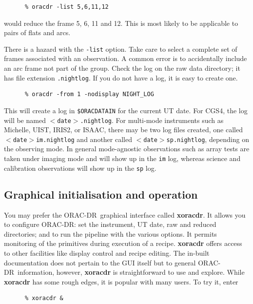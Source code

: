 \documentclass[twoside,11pt]{article}
\newcommand{\htmlref}[2]{#1}
\newcommand{\xref}[3]{#1}
\newcommand{\xlabel}[1]{}
\renewcommand{\_}{\texttt{\symbol{95}}}
\newcommand{\ORACDR}{{\footnotesize ORAC-DR}}
\begin{document}
\begin{verbatim}
      % oracdr -list 5,6,11,12
\end{verbatim}
would reduce the frame 5, 6, 11 and 12. This is most likely to
be applicable to pairs of flats and arcs.

There is a hazard with the {\tt -list} option. Take care to select
a complete set of frames associated with an observation. A common
error is to accidentally include an arc frame not part of the
group. Check the log on the raw data directory; it has file
extension {\tt .nightlog}. If you do not have a log, it is easy to
create one.
\label{night_log}

\begin{verbatim}
      % oracdr -from 1 -nodisplay NIGHT_LOG
\end{verbatim}
This will create a log in {\tt \$ORAC\_DATA\_IN} for the current
UT date. For CGS4, the log will be named {\tt $<$date$>$.nightlog}.
For multi-mode instruments such as Michelle, UIST, IRIS2, or ISAAC,
there may be two log files created, one called {\tt $<$date$>$\_im.nightlog}
and another called {\tt $<$date$>$\_sp.nightlog}, depending on the
observing mode. In general mode-agnostic observations such as array
tests are taken under imaging mode and will show up in the
{\tt \_im} log, whereas science and calibration observations will
show up in the {\tt \_sp} log.

\subsection{\xlabel{graphical_initialisation_and_operation}Graphical initialisation and
operation\label{graphical_initialisation_and_operation}}

You may prefer the \ORACDR\ graphical interface called 
\xref{{\bf xoracdr}}{sun230}{xoracdr}.
  It allows you to configure
ORAC-DR: set the instrument, UT date, raw and reduced directories; and
to run the pipeline with the various options.  It permits monitoring
of the primitives during execution of a recipe. {\bf xoracdr} offers
access to other facilities like
\htmlref{display control}{display} and recipe editing.  The in-built
documentation does not pertain to the GUI itself but to general
\ORACDR\ information, however, {\bf xoracdr} is straightforward to use
and explore.  While {\bf xoracdr} has some rough edges, it is popular
with many users.  To try it, enter

\begin{verbatim}
      % xoracdr &
\end{verbatim}
\end{document}
